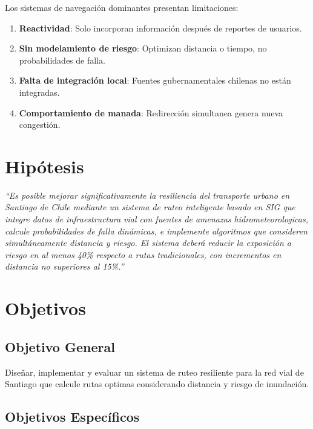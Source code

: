 \documentclass[conference]{IEEEtran}
\begin{document}
Los sistemas de navegación dominantes presentan limitaciones:

\begin{enumerate}
    \item \textbf{Reactividad}: Solo incorporan información después de reportes de usuarios.
    \item \textbf{Sin modelamiento de riesgo}: Optimizan distancia o tiempo, no probabilidades de falla.
    \item \textbf{Falta de integración local}: Fuentes gubernamentales chilenas no están integradas.
    \item \textbf{Comportamiento de manada}: Redirección simultanea genera nueva congestión.
\end{enumerate}

\section{Hipótesis}

\textit{``Es posible mejorar significativamente la resiliencia del transporte urbano en Santiago de Chile mediante un sistema de ruteo inteligente basado en SIG que integre datos de infraestructura vial con fuentes de amenazas hidrometeorologicas, calcule probabilidades de falla dinámicas, e implemente algoritmos que consideren simultáneamente distancia y riesgo. El sistema deberá reducir la exposición a riesgo en al menos 40\% respecto a rutas tradicionales, con incrementos en distancia no superiores al 15\%.''}

\section{Objetivos}

\subsection{Objetivo General}

Diseñar, implementar y evaluar un sistema de ruteo resiliente para la red vial de Santiago que calcule rutas optimas considerando distancia y riesgo de inundación.

\subsection{Objetivos Específicos}
\end{document}
